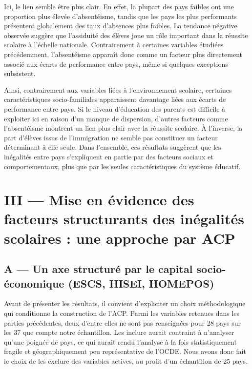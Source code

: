 \documentclass[
  french,
  11pt,
  a4paper,
]{report}
\begin{document}
Ici, le lien semble être plus clair. En effet, la plupart des pays
faibles ont une proportion plus élevée d'absentéisme, tandis que les
pays les plus performants présentent globalement des taux d'absences
plus faibles. La tendance négative observée suggère que l'assiduité des
élèves joue un rôle important dans la réussite scolaire à l'échelle
nationale. Contrairement à certaines variables étudiées précédemment,
l'absentéisme apparaît donc comme un facteur plus directement associé
aux écarts de performance entre pays, même si quelques exceptions
subsistent.

Ainsi, contrairement aux variables liées à l'environnement scolaire,
certaines caractéristiques socio-familiales apparaissent davantage liées
aux écarts de performance entre pays. Si le niveau d'éducation des
parents est difficile à exploiter ici en raison d'un manque de
dispersion, d'autres facteurs comme l'absentéisme montrent un lien plus
clair avec la réussite scolaire. À l'inverse, la part d'élèves issus de
l'immigration ne semble pas constituer un facteur déterminant à elle
seule. Dans l'ensemble, ces résultats suggèrent que les inégalités entre
pays s'expliquent en partie par des facteurs sociaux et comportementaux,
plus que par les seules caractéristiques du système éducatif.

\chapter{III --- Mise en évidence des facteurs structurants des
inégalités scolaires : une approche par
ACP}\label{iii-mise-en-uxe9vidence-des-facteurs-structurants-des-inuxe9galituxe9s-scolaires-une-approche-par-acp}

\section{A --- Un axe structuré par le capital socio-économique (ESCS,
HISEI,
HOMEPOS)}\label{a-un-axe-structuruxe9-par-le-capital-socio-uxe9conomique-escs-hisei-homepos}

Avant de présenter les résultats, il convient d'expliciter un choix
méthodologique qui conditionne la construction de l'ACP. Parmi les
variables retenues dans les parties précédentes, deux d'entre elles ne
sont pas renseignées pour 28 pays sur les 37 que compte notre
échantillon. Les inclure aurait contraint à n'analyser qu'une poignée de
pays, ce qui aurait rendu l'analyse à la fois statistiquement fragile et
géographiquement peu représentative de l'OCDE. Nous avons donc fait le
choix de les exclure des variables actives, au profit d'un échantillon
de 25 pays.
\end{document}
